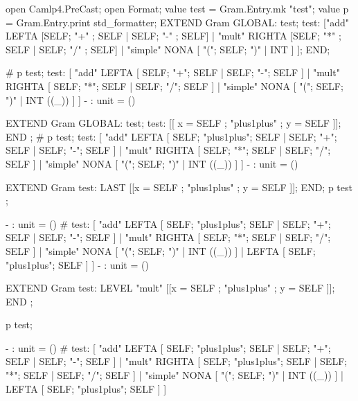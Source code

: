 \begin{ocamlcode}
open Camlp4.PreCast;
open Format;
value test = Gram.Entry.mk "test";
value p = Gram.Entry.print std_formatter;
EXTEND Gram GLOBAL: test;
  test:
    ["add" LEFTA
	[SELF; "+" ; SELF | SELF; "-" ; SELF]
    | "mult" RIGHTA
	[SELF; "*" ; SELF | SELF; "/" ; SELF]
    | "simple" NONA
	[ "("; SELF; ")"  | INT ] ];
END;
\end{ocamlcode}

\begin{ocamlcode}
#   p test;
test: [ "add" LEFTA
  [ SELF; "+"; SELF
  | SELF; "-"; SELF ]
| "mult" RIGHTA
  [ SELF; "*"; SELF
  | SELF; "/"; SELF ]
| "simple" NONA
  [ "("; SELF; ")"
  | INT ((_)) ] ]
- : unit = ()
\end{ocamlcode}

\begin{ocamlcode}
EXTEND Gram GLOBAL: test;
    test: [[ x = SELF ; "plus1plus" ; y = SELF ]];
END ;
# p test;
test: [ "add" LEFTA
  [ SELF; "plus1plus"; SELF
  | SELF; "+"; SELF
  | SELF; "-"; SELF ]
| "mult" RIGHTA
  [ SELF; "*"; SELF
  | SELF; "/"; SELF ]
| "simple" NONA
  [ "("; SELF; ")"
  | INT ((_)) ] ]
- : unit = ()    
\end{ocamlcode}

\begin{ocamlcode}
EXTEND Gram  test: LAST
    [[x = SELF ; "plus1plus" ; y = SELF ]];
  END;
p test ;

      - : unit = ()
# test: [ "add" LEFTA
  [ SELF; "plus1plus"; SELF
  | SELF; "+"; SELF
  | SELF; "-"; SELF ]
| "mult" RIGHTA
  [ SELF; "*"; SELF
  | SELF; "/"; SELF ]
| "simple" NONA
  [ "("; SELF; ")"
  | INT ((_)) ]
| LEFTA
  [ SELF; "plus1plus"; SELF ] ]
- : unit = ()
\end{ocamlcode}


\begin{ocamlcode}
EXTEND Gram
  test: LEVEL "mult"
  [[x = SELF ; "plus1plus" ; y = SELF ]];
END ;

p  test;

      - : unit = ()
#   test: [ "add" LEFTA
  [ SELF; "plus1plus"; SELF
  | SELF; "+"; SELF
  | SELF; "-"; SELF ]
| "mult" RIGHTA
  [ SELF; "plus1plus"; SELF
  | SELF; "*"; SELF
  | SELF; "/"; SELF ]
| "simple" NONA
  [ "("; SELF; ")"
  | INT ((_)) ]
| LEFTA
  [ SELF; "plus1plus"; SELF ] ]  
\end{ocamlcode}


